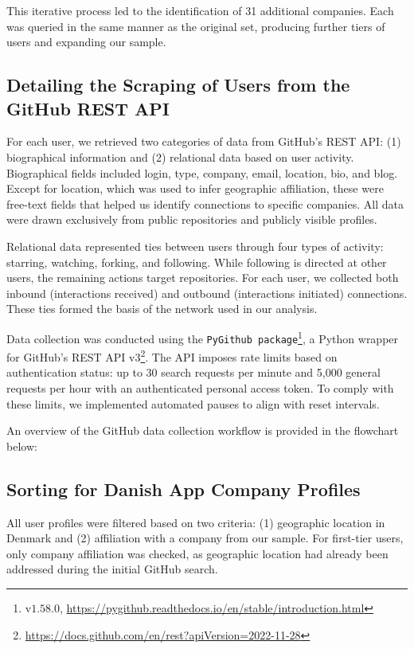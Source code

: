 This iterative process led to the identification of 31 additional companies. Each was queried in the same manner as the original set, producing further tiers of users and expanding our sample.

\subsection{Detailing the Scraping of Users from the GitHub REST API}

For each user, we retrieved two categories of data from GitHub's REST API: (1) biographical information and (2) relational data based on user activity. Biographical fields included login, type, company, email, location, bio, and blog. Except for location, which was used to infer geographic affiliation, these were free-text fields that helped us identify connections to specific companies. All data were drawn exclusively from public repositories and publicly visible profiles.

Relational data represented ties between users through four types of activity: starring, watching, forking, and following. While following is directed at other users, the remaining actions target repositories. For each user, we collected both inbound (interactions received) and outbound (interactions initiated) connections. These ties formed the basis of the network used in our analysis.

Data collection was conducted using the \texttt{PyGithub package}\footnote{v$1.58.0$, \url{https://pygithub.readthedocs.io/en/stable/introduction.html}}, a Python wrapper for GitHub's REST API v3\footnote{\url{https://docs.github.com/en/rest?apiVersion=2022-11-28}}. The API imposes rate limits based on authentication status: up to 30 search requests per minute and 5,000 general requests per hour with an authenticated personal access token. To comply with these limits, we implemented automated pauses to align with reset intervals.

An overview of the GitHub data collection workflow is provided in the flowchart below:


\subsection{Sorting for Danish App Company Profiles}

All user profiles were filtered based on two criteria: (1) geographic location in Denmark and (2) affiliation with a company from our sample. For first-tier users, only company affiliation was checked, as geographic location had already been addressed during the initial GitHub search.

